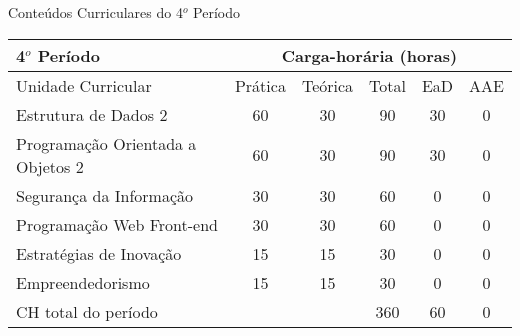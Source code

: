 \begin{quadro}[ht!]
\centering
\caption{Conteúdos Curriculares do 4$^o$ Período}\label{qua:periodo4}
\begin{tabular}{|p{8.0cm}|c|c|c|c|c|}
\hline
\rowcolor{blue1} 4$^o$ Período & \multicolumn{5}{|c|}{\centering Carga-horária (horas)} \\ \hline
\rowcolor{blue1} Unidade Curricular & Prática & Teórica & Total & EaD & AAE \\ \hline
Estrutura de Dados 2 & 60 & 30 & 90 & 30	&	0 \\	\hline
Programação Orientada a Objetos 2 & 60 & 30 & 90 & 30	&	0 \\	\hline
Segurança da Informação & 30 & 30 & 60 & 0	&	0 \\	\hline
Programação Web Front-end & 30 & 30 & 60 & 0	&	0 \\	\hline
Estratégias de Inovação & 15 & 15 & 30 & 0	&	0 \\	\hline
Empreendedorismo & 15 & 15 & 30 & 0	&	0 \\	\hline
CH total do período & \multicolumn{2}{p{3.3cm}|}{\cellcolor{blue1}} & 360 & 60	&	0 \\ \hline
 \end{tabular} \end{quadro}